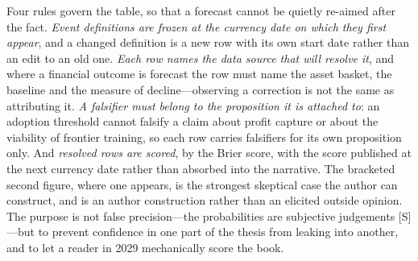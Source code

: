 Four rules govern the table, so that a forecast cannot be quietly re-aimed after the fact. \emph{Event definitions are frozen at the currency date on which they first appear}, and a changed definition is a new row with its own start date rather than an edit to an old one. \emph{Each row names the data source that will resolve it}, and where a financial outcome is forecast the row must name the asset basket, the baseline and the measure of decline---observing a correction is not the same as attributing it. \emph{A falsifier must belong to the proposition it is attached to}: an adoption threshold cannot falsify a claim about profit capture or about the viability of frontier training, so each row carries falsifiers for its own proposition only. And \emph{resolved rows are scored}, by the Brier score, with the score published at the next currency date rather than absorbed into the narrative. The bracketed second figure, where one appears, is the strongest skeptical case the author can construct, and is an author construction rather than an elicited outside opinion. The purpose is not false precision---the probabilities are subjective judgements [S]---but to prevent confidence in one part of the thesis from leaking into another, and to let a reader in 2029 mechanically score the book.

